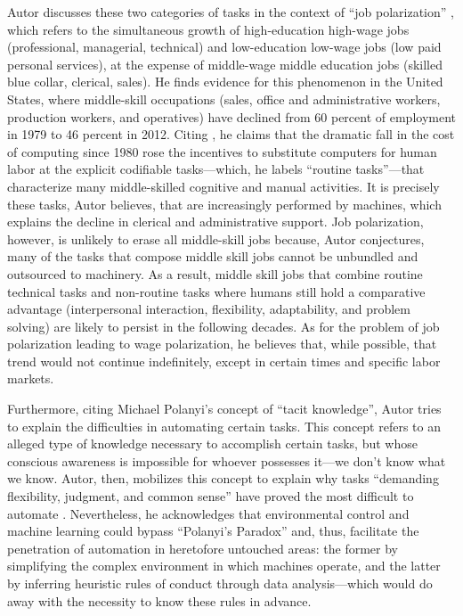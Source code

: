 \documentclass[version=last,draft=false,paper=A4,portrait,twoside=true,twocolumn=false,headinclude=false,footinclude=false,mpinclude=true,fontsize=12,BCOR=20mm,DIV=calc,pagesize=auto,open=right,chapterprefix=true,numbers=autoendperiod,headsepline=false,headings=twolinechapter,parskip=false]{scrbook}
\begin{document}
Autor discusses these two categories of tasks in the context of ``job
polarization'' \autocite{goos_manning2003}, which refers to the simultaneous
growth of high-education high-wage jobs (professional, managerial,
technical) and low-education low-wage jobs (low paid personal services), at
the expense of middle-wage middle education jobs (skilled blue collar,
clerical, sales). He finds evidence for this phenomenon in the United
States, where middle-skill occupations (sales, office and administrative
workers, production workers, and operatives) have declined from 60 percent
of employment in 1979 to 46 percent in 2012. Citing \textcite{nordhaus2007},
he claims that the dramatic fall in the cost of computing since 1980 rose
the incentives to substitute computers for human labor at the explicit
codifiable tasks---which, he labels ``routine tasks''---that characterize
many middle-skilled cognitive and manual activities. It is precisely these
tasks, Autor believes, that are increasingly performed by machines, which
explains the decline in clerical and administrative support. Job
polarization, however, is unlikely to erase all middle-skill jobs because,
Autor conjectures, many of the tasks that compose middle skill jobs cannot
be unbundled and outsourced to machinery. As a result, middle skill jobs
that combine routine technical tasks and non-routine tasks where humans
still hold a comparative advantage (interpersonal interaction, flexibility,
adaptability, and problem solving) are likely to persist in the following
decades. As for the problem of job polarization leading to wage
polarization, he believes that, while possible, that trend would not
continue indefinitely, except in certain times and specific labor markets.

Furthermore, citing Michael Polanyi's concept of ``tacit knowledge'', Autor
tries to explain the difficulties in automating certain tasks. This concept
refers to an alleged type of knowledge necessary to accomplish certain
tasks, but whose conscious awareness is impossible for whoever possesses
it---we don't know what we know. Autor, then, mobilizes this concept to
explain why tasks ``demanding flexibility, judgment, and common sense''
have proved the most difficult to automate \autocite[p. 11]{autor2015}.
Nevertheless, he acknowledges that environmental control and machine
learning could bypass ``Polanyi's Paradox'' and, thus, facilitate the
penetration of automation in heretofore untouched areas: the former by
simplifying the complex environment in which machines operate, and the
latter by inferring heuristic rules of conduct through data
analysis---which would do away with the necessity to know these rules in
advance.
\end{document}
